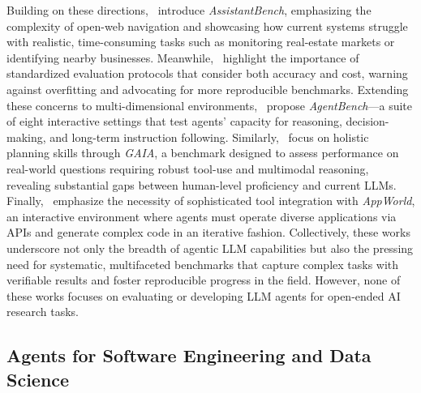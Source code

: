 Building on these directions,~\citet{yoranAssistantBenchCanWeb2024} introduce \textit{AssistantBench}, emphasizing the complexity of open-web navigation and showcasing how current systems struggle with realistic, time-consuming tasks such as monitoring real-estate markets or identifying nearby businesses. Meanwhile,~\citet{kapoor2024aiagentsmatter} highlight the importance of standardized evaluation protocols that consider both accuracy and cost, warning against overfitting and advocating for more reproducible benchmarks. Extending these concerns to multi-dimensional environments,~\citet{liuAgentBenchEvaluatingLLMs2023} propose \textit{AgentBench}—a suite of eight interactive settings that test agents’ capacity for reasoning, decision-making, and long-term instruction following. Similarly,~\citet{mialonGAIABenchmarkGeneral2023} focus on holistic planning skills through \textit{GAIA}, a benchmark designed to assess performance on real-world questions requiring robust tool-use and multimodal reasoning, revealing substantial gaps between human-level proficiency and current LLMs. Finally,~\citet{trivediAppWorldControllableWorld2024} emphasize the necessity of sophisticated tool integration with \textit{AppWorld}, an interactive environment where agents must operate diverse applications via APIs and generate complex code in an iterative fashion. Collectively, these works underscore not only the breadth of agentic LLM capabilities but also the pressing need for systematic, multifaceted benchmarks that capture complex tasks with verifiable results and foster reproducible progress in the field. However, none of these works focuses on evaluating or developing LLM agents for open-ended AI research tasks.








\subsection{Agents for Software Engineering and Data Science}

